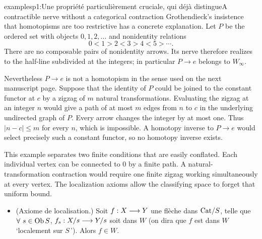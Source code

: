 \begin{dcomment}{examples}{p1:Une propriété particulièrement cruciale, qui déjà distingue}{A contractible nerve without a categorical contraction}
Grothendieck's insistence that homotopisms are too restrictive has a concrete explanation. Let \(P\) be the ordered set with objects \(0,1,2,\ldots\) and nonidentity relations
\[
  0<1>2<3>4<5>\cdots .
\]
There are no composable pairs of nonidentity arrows. Its nerve therefore realizes to the half-line subdivided at the integers; in particular \(P\to e\) belongs to \(W_\infty\).

Nevertheless \(P\to e\) is not a homotopism in the sense used on the next manuscript page. Suppose that the identity of \(P\) could be joined to the constant functor at \(c\) by a zigzag of \(m\) natural transformations. Evaluating the zigzag at an integer \(n\) would give a path of at most \(m\) edges from \(n\) to \(c\) in the underlying undirected graph of \(P\). Every arrow changes the integer by at most one. Thus \(|n-c|\leq m\) for every \(n\), which is impossible. A homotopy inverse to \(P\to e\) would select precisely such a constant functor, so no homotopy inverse exists.

This example separates two finite conditions that are easily conflated. Each individual vertex can be connected to \(0\) by a finite path. A natural-transformation contraction would require one finite zigzag working simultaneously at every vertex. The localization axioms allow the classifying space to forget that uniform bound.
\end{dcomment}


\begin{itemize}[leftmargin=*]
\item[\textbf{W(2)}] (Axiome de localisation.) Soit $f : X \longrightarrow Y$ une flèche dans $\mathrm{Cat}/S$, telle que $\forall\ s \in \operatorname{Ob} S$, $f_s : X/s \longrightarrow Y/s$ soit dans $W$ (on dira que $f$ est dans $W$ `localement sur $S$\,'). Alors $f \in W$.
\end{itemize}

